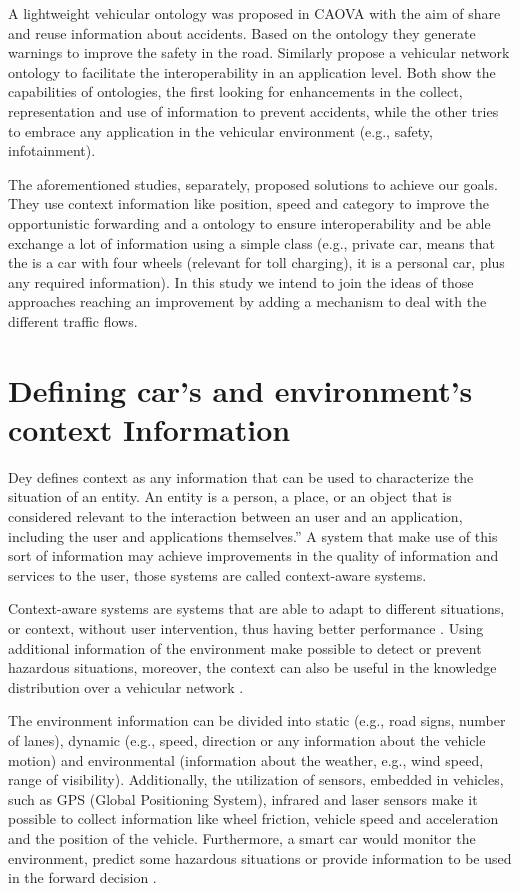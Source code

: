\documentclass[conference]{IEEEtran}
\begin{document}
A lightweight vehicular ontology was proposed in CAOVA \cite{caova2012} with the aim of share and reuse information about accidents. Based on the ontology they generate warnings to improve the safety in the road. Similarly \cite{groza2014} propose a vehicular network ontology to facilitate the interoperability in an application level. Both show the capabilities of ontologies, the first looking for enhancements in the collect, representation and use of information to prevent accidents, while the other tries to embrace any application in the vehicular environment (e.g., safety, infotainment).

The aforementioned studies, separately, proposed solutions to achieve our goals. They use context information like position, speed and category to improve the opportunistic forwarding and a ontology to ensure interoperability and be able exchange a lot of information using a simple class (e.g., private car, means that the is a car with four wheels (relevant for toll charging), it is a personal car, plus any required information). In this study we intend to join the ideas of those approaches reaching an improvement by adding a mechanism to deal with the different traffic flows.

\section{Defining car's and environment's context Information}

Dey \cite{dey2001} defines context as any information that can be used to characterize the situation of an entity. An entity is a person, a place, or an object that is considered relevant to the interaction between an user and an application, including the user and applications themselves.” A system that make use of this sort of information may achieve improvements in the quality of information and services to the user, those systems are called context-aware systems.

 Context-aware systems are systems that are able to adapt to  different situations, or context, without user intervention, thus having better performance \cite{baldauf2007}. Using additional information of the environment make possible to detect or prevent hazardous situations, moreover, the context can also be useful in the knowledge distribution over a vehicular network \cite{tocadas2010}.

The environment information can be divided into static (e.g., road signs, number of lanes), dynamic (e.g., speed, direction or any information about the vehicle motion) and environmental (information about the weather, e.g., wind speed, range of visibility). Additionally, the utilization of sensors, embedded in vehicles, such as GPS (Global Positioning System), infrared and laser sensors make it possible to collect information like wheel friction, vehicle speed and acceleration and the position of the vehicle. Furthermore, a smart car would monitor the environment, predict some hazardous situations or provide information to be used in the forward decision \cite{tocadas2010}.
\end{document}
